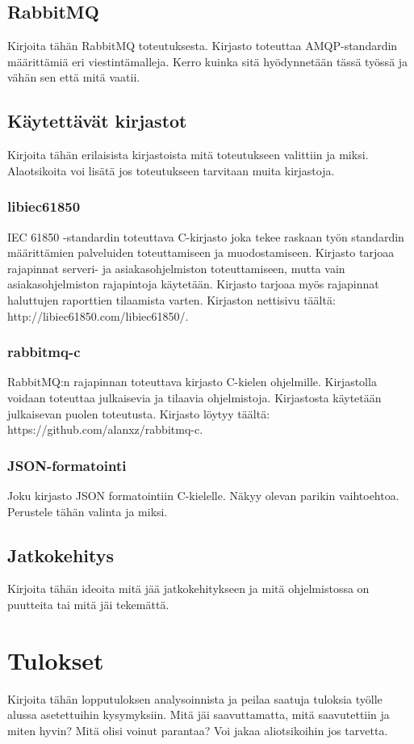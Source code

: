 \documentclass[globalnumbering,centeredcaptions,draftfooter]{tutthesis} %
\begin{document}
\section{RabbitMQ}
Kirjoita tähän RabbitMQ toteutuksesta. Kirjasto toteuttaa AMQP-standardin määrittämiä eri viestintämalleja. Kerro kuinka sitä hyödynnetään tässä työssä ja vähän sen että mitä vaatii.

\section{Käytettävät kirjastot}
Kirjoita tähän erilaisista kirjastoista mitä toteutukseen valittiin ja miksi. Alaotsikoita voi lisätä jos toteutukseen tarvitaan muita kirjastoja.

\subsection{libiec61850}
IEC 61850 -standardin toteuttava C-kirjasto joka tekee raskaan työn standardin määrittämien palveluiden toteuttamiseen ja muodostamiseen. Kirjasto tarjoaa rajapinnat serveri- ja asiakasohjelmiston toteuttamiseen, mutta vain asiakasohjelmiston rajapintoja käytetään. Kirjasto tarjoaa myös rajapinnat haluttujen raporttien tilaamista varten. Kirjaston nettisivu täältä: http://libiec61850.com/libiec61850/.

\subsection{rabbitmq-c}
RabbitMQ:n rajapinnan toteuttava kirjasto C-kielen ohjelmille. Kirjastolla voidaan toteuttaa julkaisevia ja tilaavia ohjelmistoja. Kirjastosta käytetään julkaisevan puolen toteutusta. Kirjasto löytyy täältä: https://github.com/alanxz/rabbitmq-c.

\subsection{JSON-formatointi}
Joku kirjasto JSON formatointiin C-kielelle. Näkyy olevan parikin vaihtoehtoa. Perustele tähän valinta ja miksi.

\section{Jatkokehitys}
Kirjoita tähän ideoita mitä jää jatkokehitykseen ja mitä ohjelmistossa on puutteita tai mitä jäi tekemättä.

\chapter{Tulokset}
\label{ch:tulokset}
Kirjoita tähän lopputuloksen analysoinnista ja peilaa saatuja tuloksia työlle alussa asetettuihin kysymyksiin. Mitä jäi saavuttamatta, mitä saavutettiin ja miten hyvin? Mitä olisi voinut parantaa? Voi jakaa aliotsikoihin jos tarvetta.
\end{document}
